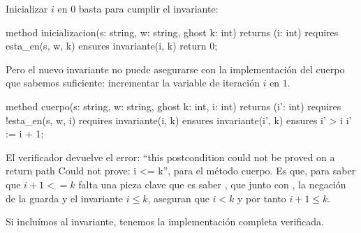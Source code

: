 \documentclass[12pt, a4paper, openany, fleqn]{book}
\begin{document}
    Inicializar $i$ en $0$ basta para cumplir el invariante:

    \begin{dafny}
method inicializacion(s: string, w: string, ghost k: int) returns (i: int)
  requires esta_en(s, w, k)
  ensures invariante(i, k)
{
  return 0;
}
    \end{dafny}

    Pero el nuevo invariante no puede asegurarse con la implementación del cuerpo que sabemos suficiente: incrementar la variable de iteración $i$ en $1$.

    \begin{dafny}
method cuerpo(s: string, w: string, ghost k: int, i: int) returns (i': int)
  requires !esta_en(s, w, i)
  requires invariante(i, k)
  ensures invariante(i', k)
  ensures i' > i
{
  i' := i + 1;
}
    \end{dafny}
    El verificador devuelve el error: ``this postcondition could not be proved on a return path
    Could not prove: i <= k'', para el método cuerpo.
    Es que, para saber que $i+1<=k$ falta una pieza clave que es saber , que junto con , la negación de la guarda y el invariante $i \leq k$, aseguran que $i < k$ y por tanto $i+1 \leq k$.

    Si incluímos  al invariante, tenemos la implementación completa verificada.

\end{document}
